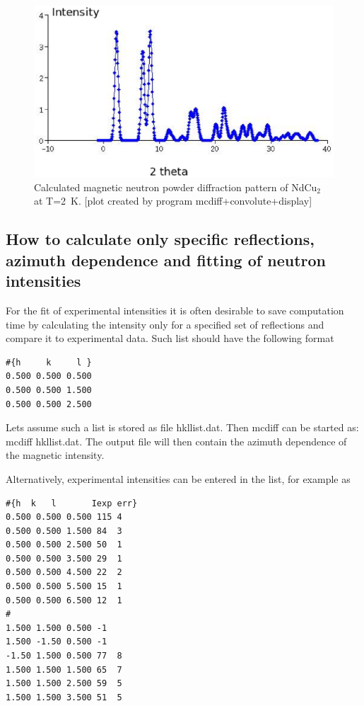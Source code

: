\begin{figure}[ht]
\includegraphics[angle=0,width=1.1\textwidth]{figsrc/patternAF1.eps}
\caption{\label{elnpattern}
Calculated magnetic neutron powder diffraction pattern
of NdCu$_2$~\cite{gratz91-9297} at T=2~K.
[plot created by program {\prg mcdiff+convolute+display}]}
\end{figure}

\subsection{How to calculate only specific reflections, azimuth dependence and fitting of neutron %
intensities}

For the fit of experimental intensities it is often desirable to save computation
time by calculating the intensity only for a specified set of reflections and 
compare it to experimental data. Such list should have the following format

\begin{verbatim}
#{h     k     l }
0.500 0.500 0.500 
0.500 0.500 1.500 
0.500 0.500 2.500 
\end{verbatim}

Lets assume such a list is stored  as file {\prg hkllist.dat}.
Then {\prg mcdiff} can be started as: {\prg mcdiff hkllist.dat}.
The output file will then contain the azimuth dependence of the magnetic intensity.

Alternatively, experimental intensities can be entered in the list, for example as

\begin{verbatim}
#{h  k   l       Iexp err}
0.500 0.500 0.500 115 4
0.500 0.500 1.500 84  3
0.500 0.500 2.500 50  1
0.500 0.500 3.500 29  1
0.500 0.500 4.500 22  2
0.500 0.500 5.500 15  1
0.500 0.500 6.500 12  1
#
1.500 1.500 0.500 -1
1.500 -1.50 0.500 -1
-1.50 1.500 0.500 77  8
1.500 1.500 1.500 65  7
1.500 1.500 2.500 59  5
1.500 1.500 3.500 51  5
\end{verbatim}


